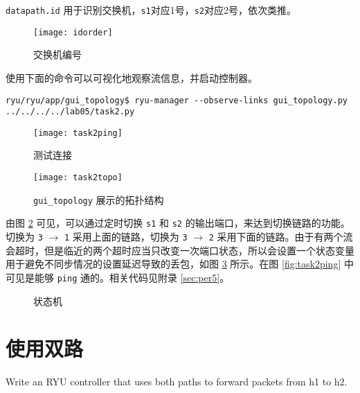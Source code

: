     \verb"datapath.id" 用于识别交换机，\verb"s1"对应1号，\verb"s2"对应2号，依次类推。

    \begin{figure}[H]
        \centering
        \texttt{[image: idorder]}
        \caption{交换机编号}\label{fig:idorder}
    \end{figure}

    使用下面的命令可以可视化地观察流信息\cite{gui}，并启动控制器。
    \begin{lstlisting}[style=commandshell]
        ryu/ryu/app/gui_topology$ ryu-manager --observe-links gui_topology.py ../../../../lab05/task2.py\end{lstlisting}

    \begin{figure}[H]
        \centering
        \begin{minipage}{0.48\textwidth}
            \centering
            \texttt{[image: task2ping]}
            \caption{测试连接}\label{fig:task2ping}
        \end{minipage}
        \begin{minipage}{0.48\textwidth}
            \centering
            \texttt{[image: task2topo]}
            \caption{\texttt{gui\_topology} 展示的拓扑结构}\label{fig:task2topo}
        \end{minipage}
    \end{figure}

    由图 \ref{fig:task2topo} 可见，可以通过定时切换 \verb"s1" 和 \verb"s2" 的输出端口，来达到切换链路的功能。切换为 \verb"3" $\rightarrow$ \verb"1" 采用上面的链路，切换为 \verb"3" $\rightarrow$ \verb"2" 采用下面的链路。由于有两个流会超时，但是临近的两个超时应当只改变一次端口状态，所以会设置一个状态变量用于避免不同步情况的设置延迟导致的丢包，如图 \ref{fig:pathstate} 所示。在图 \ref{fig:task2ping} 中可见是能够 \verb"ping" 通的。相关代码见附录 \ref{sec:per5}。

    \begin{figure}[H]
        \centering
        
        \caption{状态机}\label{fig:pathstate}
    \end{figure}

    \section{使用双路}
    Write an RYU controller that uses both paths to forward packets from h1 to h2.

